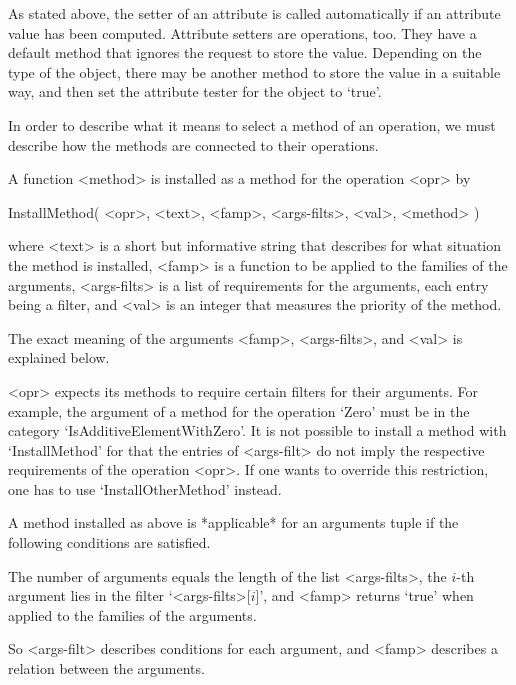 As stated above, the setter of an attribute is called automatically
if an attribute value has been computed.
Attribute setters are operations, too.
They have a default method that ignores the request to store the value.
Depending on the type of the object,
there may be another method to store the value in a suitable way,
and then set the attribute tester for the object to `true'.



In order to describe what it means to select a method of an operation,
we must describe how the methods are connected to their operations.

A function <method> is installed as a method for the operation <opr> by

\>InstallMethod( <opr>, <text>, <famp>, <args-filts>, <val>, <method> )

where <text> is a short but informative string that describes for what
situation the method is installed,
<famp> is a function to be applied to the families of the arguments,
<args-filts> is a list of requirements for the arguments,
each entry being a filter,
and <val> is an integer that measures the priority of the method.

The exact meaning of the arguments <famp>, <args-filts>, and <val>
is explained below.

<opr> expects its methods to require certain filters for their arguments.
For example, the argument of a method for the operation `Zero' must be
in the category `IsAdditiveElementWithZero'.
It is not possible to install a method with `InstallMethod' for that the
entries of <args-filt> do not imply the respective requirements of the
operation <opr>.
If one wants to override this restriction,
one has to use `InstallOtherMethod' instead.



A method installed as above is *applicable* for an arguments tuple
if the following conditions are satisfied.

The number of arguments equals the length of the list <args-filts>,
the $i$-th argument lies in the filter `<args-filts>[$i$]',
and <famp> returns `true' when applied to the families of the arguments.

So <args-filt> describes conditions for each argument,
and <famp> describes a relation between the arguments.

